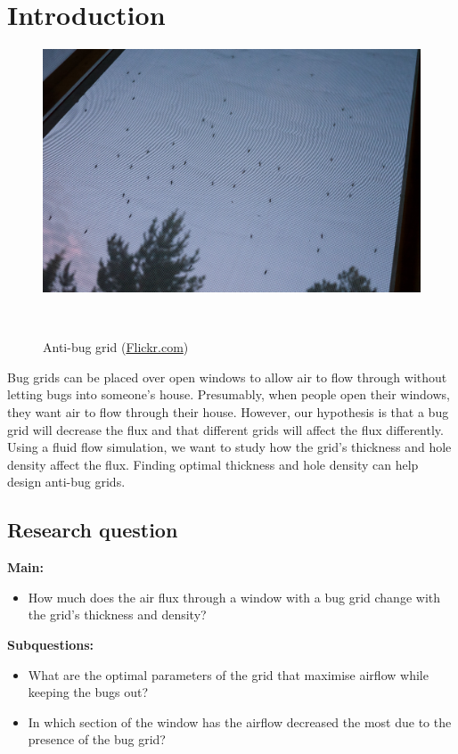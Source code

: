 \section{Introduction} \label{section: intro and motiv}

\begin{figure}
\vspace{-1.5cm}
\includegraphics[width=0.9\linewidth]{figures/mosquitogrid.jpg}
\caption{Anti-bug grid (\href{https://www.flickr.com/photos/neekohfi/7817306994/}{Flickr.com})}\
\end{figure}

Bug grids can be placed over open windows to allow air to flow through without letting bugs into someone's house. Presumably, when people open their windows, they want air to flow through their house. However, our hypothesis is that a bug grid will decrease the flux and that different grids will affect the flux differently. Using a fluid flow simulation, we want to study how the grid's thickness and hole density affect the flux. Finding optimal thickness and hole density can help design anti-bug grids.

\subsection{Research question}
\textbf{Main:}
\begin{itemize}
    \item How much does the air flux through a window with a bug grid change with the grid's thickness and density?
\end{itemize}
\textbf{Subquestions:}
\begin{itemize}
    \item What are the optimal parameters of the grid that maximise airflow while keeping the bugs out?
    \item In which section of the window has the airflow decreased the most due to the presence of the bug grid?
\end{itemize}

